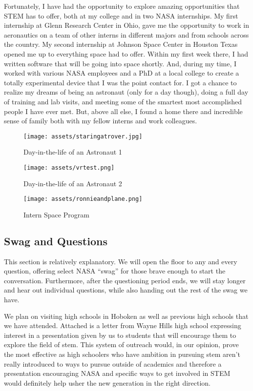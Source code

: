 \documentclass{article}
\let\Oldsubsection\subsection
\renewcommand{\subsection}{\FloatBarrier\Oldsubsection}
\begin{document}
Fortunately, I have had the opportunity to explore amazing opportunities that STEM has to offer, both at my college and in two NASA internships. My first internship at Glenn Research Center in Ohio, gave me the opportunity to work in aeronautics on a team of other interns in different majors and from schools across the country. My second internship at Johnson Space Center in Houston Texas opened me up to everything space had to offer. Within my first week there, I had written software that will be going into space shortly. And, during my time, I worked with various NASA employees and a PhD at a local college to create a totally experimental device that I was the point contact for. I got a chance to realize my dreams of being an astronaut (only for a day though), doing a full day of training and lab visits, and meeting some of the smartest most accomplished people I have ever met. But, above all else, I found a home there and incredible sense of family both with my fellow interns and work colleagues.

\begin{figure}[!htb]
  \centering
  \texttt{[image: assets/staringatrover.jpg]}
  \caption{Day-in-the-life of an Astronaut 1}
  \label{fig:staringatrover}
\end{figure}

\begin{figure}[!htb]
  \centering
  \texttt{[image: assets/vrtest.png]}
  \caption{Day-in-the-life of an Astronaut 2}
  \label{fig:vrtest}
\end{figure}

\begin{figure}[!htb]
  \centering
  \texttt{[image: assets/ronnieandplane.png]}
  \caption{Intern Space Program}
  \label{fig:ronnieandplane}
\end{figure}

\subsection{Swag and Questions}

This section is relatively explanatory. We will open the floor to any and every question, offering select NASA “swag” for those brave enough to start the conversation. Furthermore, after the questioning period ends, we will stay longer and hear out individual questions, while also handing out the rest of the swag we have. 

We plan on visiting high schools in Hoboken as well as previous high schools that we have attended. Attached is a letter from Wayne Hills high school expressing interest in a presentation given by us to students that will encourage them to explore the field of stem. This system of outreach would, in our opinion, prove the most effective as high schoolers who have ambition in pursuing stem aren’t really introduced to ways to pursue outside of academics and therefore a presentation encouraging NASA and specific ways to get involved in STEM would definitely help usher the new generation in the right direction.
\end{document}
